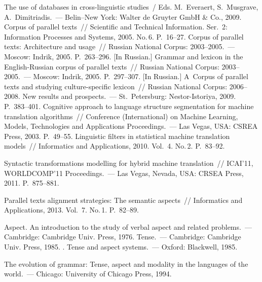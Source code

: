 \begin{multicols}{2}
{{\begin{thebibliography}{99}
The use of databases in cross-linguistic studies~/ Eds. M.~Everaert, S.~Musgrave, A.~Dimitriadis.~--- 
Belin--New York: Walter de Gruyter GmbH \& Co., 2009.
 Corpus of parallel texts~// Scientific and 
Technical Information. Ser.~2: Information Processes and Systems, 2005. No.\,6. P.~16--27.
 Corpus of parallel texts: Architecture and 
usage~// Russian National Corpus: 2003--2005.~--- Moscow: Indrik, 2005.  P.~263--296. [In Russian.]
 Grammar and lexicon in the English-Russian corpus of 
parallel texts~// Russian National Corpus: 2003--2005.~--- Moscow: Indrik, 2005.  P.~297--307.
[In Russian.]
 A~Corpus of parallel texts and studying culture-specific lexicon~// 
Russian National Corpus: 2006--2008. New results and prospects.~--- St.\ Petersburg: 
Nestor-Istoriya, 2009.  P.~383--401.
 Cognitive approach to language structure segmentation for machine 
translation algorithms~// Conference (International) on Machine Learning, Models, Technologies 
and Applications Proceedings.~---  Las Vegas, USA: CSREA Press, 2003. P.~49--55.
 Linguistic filters in statistical machine translation models~// Informatics 
and Applications, 2010. Vol.~4. No.\,2. P.~83--92.

 Syntactic transformations modelling for hybrid machine translation~// 
ICAI'11, WORLDCOMP'11 Proceedings.~--- Las Vegas, Nevada, USA:  CRSEA Press, 2011. P.~875--881.

 Parallel texts alignment strategies: The semantic aspects~// Informatics and 
Applications, 2013. Vol.~7. No.\,1.  P.~82--89.

 Aspect. An introduction to the study of verbal aspect and related problems.~---
Cambridge: Cambridge Univ. Press, 1976.
 Tense.~--- Cambridge: Cambridge Univ. Press, 1985.
. Tense and aspect systems.~--- Oxford: Blackwell, 1985.

 The evolution of grammar: Tense, aspect and modality 
in the languages of the world.~--- Chicago: University of Chicago Press, 1994.


\end{thebibliography}}}
\end{multicols}
